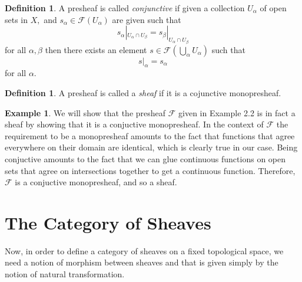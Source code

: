 \documentclass[psamsfonts]{amsart}
\theoremstyle{definition}
\newtheorem{defn}[thm]{Definition}
\newtheorem{exmp}[thm]{Example}
\theoremstyle{remark}
\numberwithin{equation}{section}
\begin{document}
  \begin{defn}
    A presheaf is called \textit{conjunctive} if given a collection $U_\alpha$ of open sets in $X,$ and $s_\alpha \in \mathscr{F}(U_\alpha)$ are given such that 
    \[s_\alpha|_{U_\alpha \cap U_\beta}= s_\beta|_{U_\alpha \cap U_\beta}\] for all $\alpha, \beta$ then there exists an element $s \in \mathscr{F}(\bigcup_\alpha U_\alpha)$ such that 
    \[s|_\alpha = s_\alpha\]
    for all $\alpha.$ \cite{bredon_1997}
  \end{defn}
  
  \begin{defn}
    A presheaf is called a \textit{sheaf} if it is a cojunctive monopresheaf. \cite{wiki_Sheaf}
  \end{defn}

  \begin{exmp}
    We will show that the presheaf $\mathscr{F}$ given in Example 2.2 is in fact a sheaf by showing that it is a conjuctive monopresheaf. In the context of $\mathscr{F}$ the requirement to be a monopresheaf amounts to the fact that functions that agree everywhere on their domain are identical, which is clearly true in our case. Being conjuctive amounts to the fact that we can glue continuous functions  on open sets that agree on intersections together to get a continuous function. Therefore, $\mathscr{F}$ is a conjuctive monopresheaf, and so a sheaf.
  \end{exmp}

  


\section{The Category of Sheaves}
   Now, in order to define a category of sheaves on a fixed topological space, we need a notion of morphism between sheaves and that is given simply by the notion of natural transformation.
\end{document}
